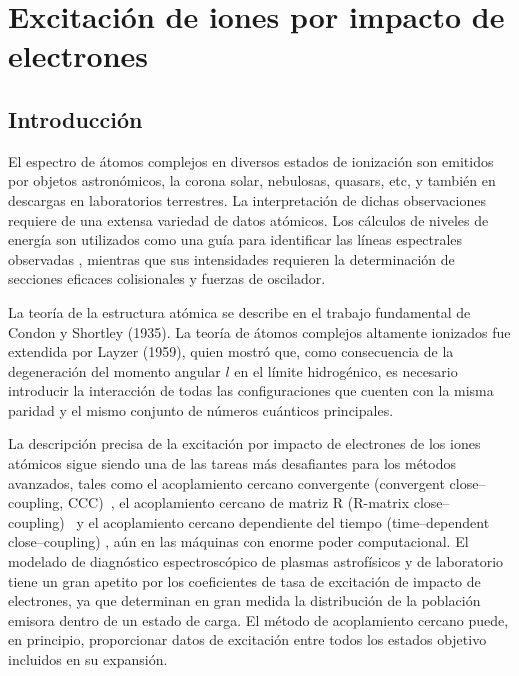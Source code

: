\chapter{Excitación de iones por impacto de electrones}

\section{Introducción}
\label{sec:intro}

El espectro de átomos complejos en diversos estados de ionización son 
emitidos por objetos astronómicos, la corona solar, nebulosas, quasars, 
etc, y también en descargas en laboratorios terrestres. La interpretación
de dichas observaciones requiere de una extensa variedad de datos 
atómicos. Los cálculos de niveles de energía son utilizados como una guía
para identificar las líneas espectrales observadas , mientras que sus 
intensidades requieren la determinación de secciones eficaces 
colisionales y fuerzas de oscilador.

La teoría de la estructura atómica se describe en el trabajo fundamental
de Condon y Shortley (1935). La teoría de átomos complejos altamente 
ionizados fue extendida por Layzer (1959), quien mostró que, como 
consecuencia de la degeneración del momento angular $l$ en el límite 
hidrogénico, es necesario introducir la interacción de todas las 
configuraciones que cuenten con la misma paridad y el mismo conjunto de 
números cuánticos principales.

La descripción precisa de la excitación por impacto de electrones de los 
iones atómicos sigue siendo una de las tareas más desafiantes para los 
métodos avanzados, tales como el acoplamiento cercano convergente 
(convergent close--coupling, CCC)~\cite{Bray:92}, el acoplamiento cercano 
de matriz R (R-matrix close--coupling)~\cite{Burke:75} y el acoplamiento 
cercano dependiente del tiempo (time--dependent close--coupling) 
\cite{Pindzola:07}, aún en las máquinas con enorme poder computacional.
El modelado de diagnóstico espectroscópico de plasmas astrofísicos y de 
laboratorio tiene un gran apetito por los coeficientes de tasa de 
excitación de impacto de electrones, ya que determinan en gran medida la 
distribución de la población emisora dentro de un estado de carga. El 
método de acoplamiento cercano puede, en principio, proporcionar datos 
de excitación entre todos los estados objetivo incluidos en su expansión.




